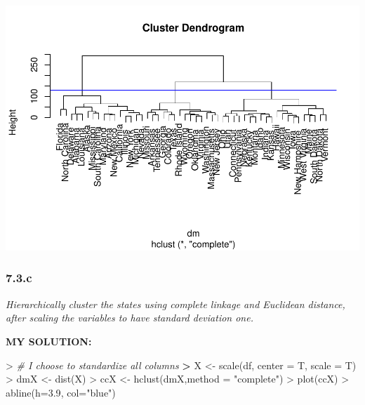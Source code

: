 \documentclass[
]{article}
\newenvironment{Shaded}{\begin{snugshade}}{\end{snugshade}}
\newcommand{\AttributeTok}[1]{\textcolor[rgb]{0.77,0.63,0.00}{#1}}
\newcommand{\CommentTok}[1]{\textcolor[rgb]{0.56,0.35,0.01}{\textit{#1}}}
\newcommand{\ErrorTok}[1]{\textcolor[rgb]{0.64,0.00,0.00}{\textbf{#1}}}
\newcommand{\FloatTok}[1]{\textcolor[rgb]{0.00,0.00,0.81}{#1}}
\newcommand{\FunctionTok}[1]{\textcolor[rgb]{0.00,0.00,0.00}{#1}}
\newcommand{\NormalTok}[1]{#1}
\newcommand{\OtherTok}[1]{\textcolor[rgb]{0.56,0.35,0.01}{#1}}
\newcommand{\SpecialCharTok}[1]{\textcolor[rgb]{0.00,0.00,0.00}{#1}}
\newcommand{\StringTok}[1]{\textcolor[rgb]{0.31,0.60,0.02}{#1}}
\begin{document}
\includegraphics{HUDM6122-Homework_07-Chenguang-Pan_files/figure-latex/unnamed-chunk-5-1.pdf}

\hypertarget{c}{%
\subsubsection{7.3.c}\label{c}}

\emph{Hierarchically cluster the states using complete linkage and
Euclidean distance, after scaling the variables to have standard
deviation one.}

\textbf{MY SOLUTION:}

\begin{Shaded}
\begin{Highlighting}[]
\SpecialCharTok{\textgreater{}} \CommentTok{\# I choose to standardize all columns}
\ErrorTok{\textgreater{}}\NormalTok{ X }\OtherTok{\textless{}{-}} \FunctionTok{scale}\NormalTok{(df, }\AttributeTok{center =}\NormalTok{ T, }\AttributeTok{scale =}\NormalTok{ T)}
\SpecialCharTok{\textgreater{}}\NormalTok{ dmX }\OtherTok{\textless{}{-}} \FunctionTok{dist}\NormalTok{(X)}
\SpecialCharTok{\textgreater{}}\NormalTok{ ccX }\OtherTok{\textless{}{-}} \FunctionTok{hclust}\NormalTok{(dmX,}\AttributeTok{method =} \StringTok{"complete"}\NormalTok{)}
\SpecialCharTok{\textgreater{}} \FunctionTok{plot}\NormalTok{(ccX)}
\SpecialCharTok{\textgreater{}} \FunctionTok{abline}\NormalTok{(}\AttributeTok{h=}\FloatTok{3.9}\NormalTok{, }\AttributeTok{col=}\StringTok{"blue"}\NormalTok{)}
\end{Highlighting}
\end{Shaded}
\end{document}
